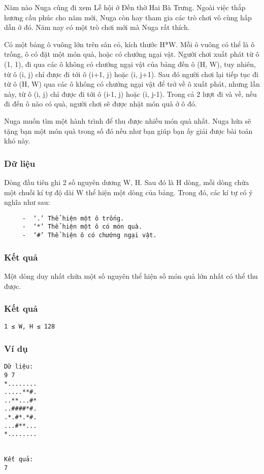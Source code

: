 



   Năm nào Nuga cũng đi xem Lễ hội ở Đền thờ Hai Bà Trưng. Ngoài việc thắp hương cầu phúc cho năm mới, Nuga còn hay tham gia các trò chơi vô cùng hấp dẫn ở đó. Năm nay có một trò chơi mới mà Nuga rất thích.  

   Có một bảng ô vuông lớn trên sân cỏ, kích thước H*W. Mỗi ô vuông có thể là ô trống, ô có đặt một món quà, hoặc có chướng ngại vật. Người chơi xuất phát từ ô (1, 1), đi qua các ô không có chướng ngại vật của bảng đến ô (H, W), tuy nhiên, từ ô (i, j) chỉ được đi tới ô (i+1, j) hoặc (i, j+1). Sau đó người chơi lại tiếp tục đi từ ô (H, W) qua các ô không có chướng ngại vật để trở về ô xuất phát, nhưng lần này, từ ô (i, j) chỉ được đi tới ô (i-1, j) hoặc (i, j-1). Trong cả 2 lượt đi và về, nếu đi đến ô nào có quà, người chơi sẽ được nhặt món quà ở ô đó.  

   Nuga muốn tìm một hành trình để thu được nhiều món quà nhất. Nuga hứa sẽ tặng bạn một món quà trong số đó nếu như bạn giúp bạn ấy giải được bài toán khó này.  

\subsubsection{   Dữ liệu  }

   Dòng đầu tiên ghi 2 số nguyên dương W, H. Sau đó là H dòng, mỗi dòng chứa một chuỗi kí tự độ dài W thể hiện một dòng của bảng. Trong đó, các kí tự có ý nghĩa như sau:  
\begin{verbatim}
     -	‘.’ Thể hiện một ô trống.
     -	‘*’ Thể hiện một ô có món quà.
     -	‘#’ Thể hiện ô có chướng ngại vật.
\end{verbatim}



\subsubsection{   Kết quả  }

   Một dòng duy nhất chứa một số nguyên thể hiện số món quà lớn nhất có thể thu được.  

\subsubsection{   Kết quả  }
\begin{verbatim}
1 ≤ W, H ≤ 128
\end{verbatim}

\subsubsection{   Ví dụ  }
\begin{verbatim}
Dữ liệu:
9 7
*........
.....**#.
..**...#*
..####*#.
.*.#*.*#.
...#**...
*........


Kết quả:
7


\end{verbatim}